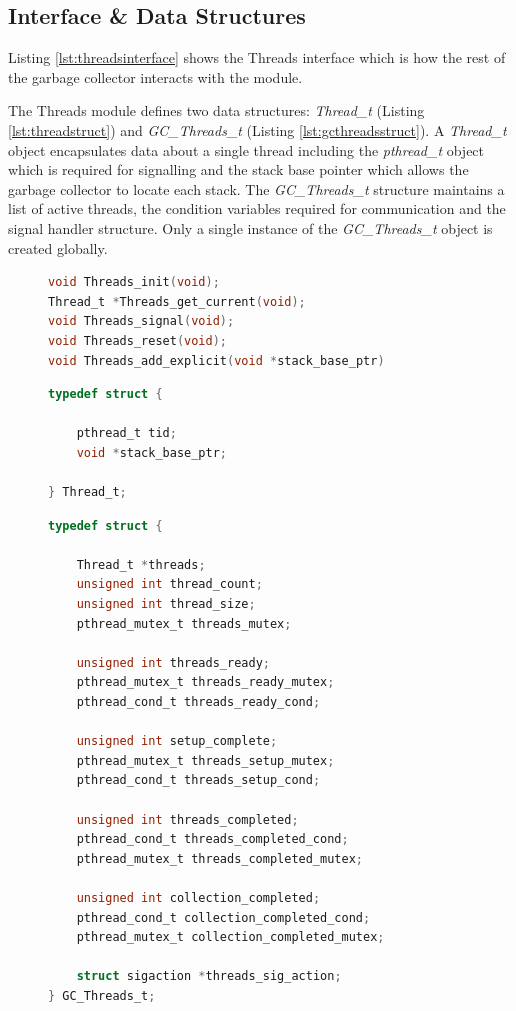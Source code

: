 \documentclass[../diss.tex]{subfiles}
\begin{document}
\subsection{Interface \& Data Structures} \label{sec:threadsinterface}

Listing \ref{lst:threadsinterface} shows the Threads interface which is how the rest of the garbage collector interacts with the module.

The Threads module defines two data structures: \emph{Thread\_t} (Listing \ref{lst:threadstruct}) and \emph{GC\_Threads\_t} (Listing \ref{lst:gcthreadsstruct}). A \emph{Thread\_t} object encapsulates data about a single thread including the \emph{pthread\_t} object which is required for signalling and the stack base pointer which allows the garbage collector to locate each stack. The \emph{GC\_Threads\_t} structure maintains a list of active threads, the condition variables required for communication and the signal handler structure. Only a single instance of the \emph{GC\_Threads\_t} object is created globally.

\begin{figure}
\begin{lstlisting}[language=C, caption=The Threads interface, label={lst:threadsinterface}]
void Threads_init(void);
Thread_t *Threads_get_current(void);
void Threads_signal(void);
void Threads_reset(void);
void Threads_add_explicit(void *stack_base_ptr)
\end{lstlisting}
\end{figure}

\begin{figure}
\begin{lstlisting}[language=C, caption=The Thread\_t structure, label={lst:threadstruct}]
typedef struct {

    pthread_t tid;
    void *stack_base_ptr;

} Thread_t;
\end{lstlisting}

\begin{lstlisting}[language=C, caption=The GC\_Threads\_t structure, label={lst:gcthreadsstruct}]
typedef struct {

    Thread_t *threads;
    unsigned int thread_count;
    unsigned int thread_size;
    pthread_mutex_t threads_mutex;

    unsigned int threads_ready;
    pthread_mutex_t threads_ready_mutex;
    pthread_cond_t threads_ready_cond;

    unsigned int setup_complete;
    pthread_mutex_t threads_setup_mutex;
    pthread_cond_t threads_setup_cond;

    unsigned int threads_completed;
    pthread_cond_t threads_completed_cond;
    pthread_mutex_t threads_completed_mutex;

    unsigned int collection_completed;
    pthread_cond_t collection_completed_cond;
    pthread_mutex_t collection_completed_mutex;

    struct sigaction *threads_sig_action;
} GC_Threads_t;
\end{lstlisting}
\end{figure}
\end{document}

